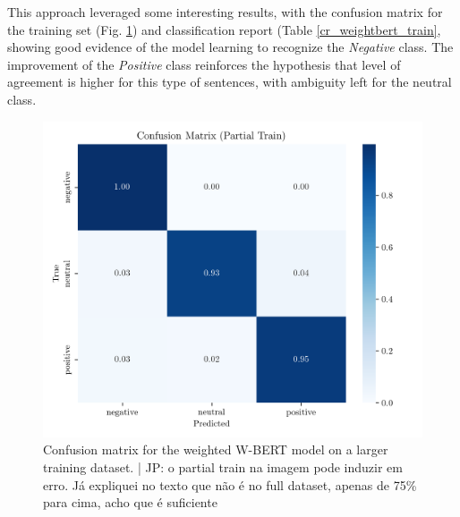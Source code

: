 \documentclass[conference]{IEEEtran}
\begin{document}
This approach leveraged some interesting results, with the confusion matrix for the training set (Fig. \ref{fig:weighted_bert_confusion_matrix_Partial}) and classification report (Table \ref{cr_weightbert_train}, showing good evidence of the model learning to recognize the \textit{Negative} class. The improvement of the \textit{Positive} class reinforces the hypothesis that level of agreement is higher for this type of sentences, with ambiguity left for the neutral class.



\begin{figure}[H]
    \centering
    \includegraphics[width=1\linewidth]{assets/weighted_bert_confusion_matrix_Partial Train.png}
    \caption{Confusion matrix for the weighted W-BERT model on a larger training dataset. | JP: o partial train na imagem pode induzir em erro. Já expliquei no texto que não é no full dataset, apenas de 75\% para cima, acho que é suficiente}
    \label{fig:weighted_bert_confusion_matrix_Partial}
\end{figure}
\end{document}
